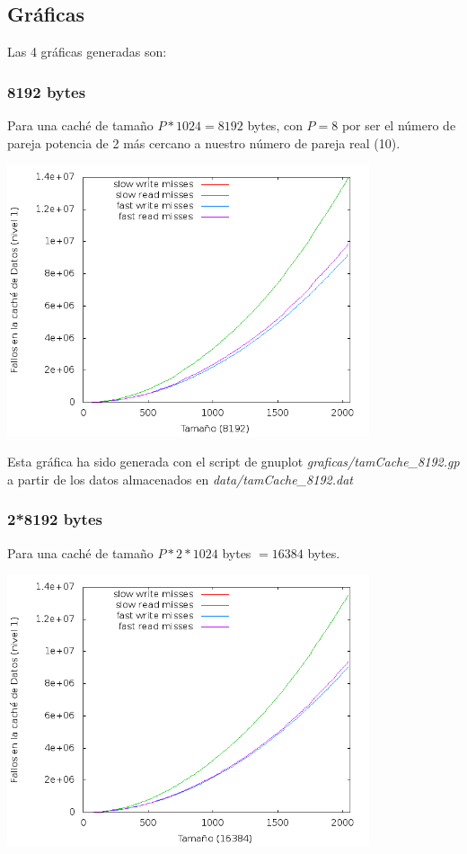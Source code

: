 \documentclass[nochap]{apuntes}
\begin{document}
\subsection{Gr\'aficas}
Las 4 gráficas generadas son:

\subsubsection{8192 bytes}
Para una caché de tamaño $P*1024 = 8192$ bytes, con $P=8$ por ser el número de pareja potencia de 2 más cercano a nuestro número de pareja real (10).

\begin{center}
\includegraphics[width=0.8\textwidth]{graficas/fotos/Cache_8192.png}
\end{center}

Esta gráfica ha sido generada con el script de gnuplot \emph{graficas/tamCache\_8192.gp} a partir de los datos almacenados en \emph{data/tamCache\_8192.dat}
\subsubsection{2*8192 bytes}
Para una caché de tamaño $P*2*1024$ bytes $= 16384 $ bytes.

\begin{center}
\includegraphics[width=0.8\textwidth]{graficas/fotos/Cache_16384.png}
\end{center}
\end{document}
